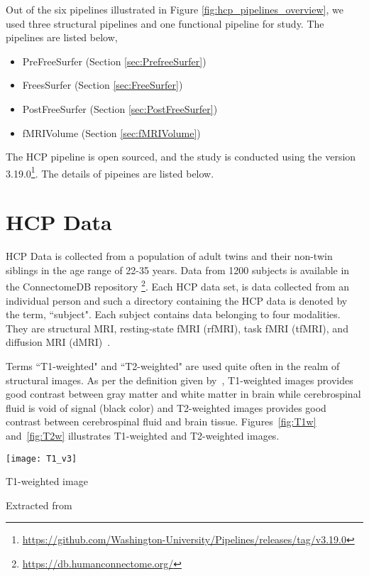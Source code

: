 Out of the six pipelines illustrated in Figure \ref{fig:hcp_pipelines_overview}, we used three structural pipelines and one functional pipeline for study. The pipelines are listed below, 
\begin{itemize}
  \item PreFreeSurfer (Section \ref{sec:PrefreeSurfer})
  \item FreesSurfer   (Section \ref{sec:FreeSurfer})
  \item PostFreeSurfer (Section \ref{sec:PostFreeSurfer})
  \item fMRIVolume    (Section \ref{sec:fMRIVolume})
\end{itemize}

The HCP pipeline is open sourced, and the study is conducted using the version 3.19.0\footnote{\url{https://github.com/Washington-University/Pipelines/releases/tag/v3.19.0}}. The details of pipeines are listed below.

\section{HCP Data} \label{HCP_Data}
HCP Data is collected from a population of adult twins and their non-twin siblings in the age range of 22-35 years. Data from 1200 subjects is available in the ConnectomeDB repository \footnote{\url{https://db.humanconnectome.org/}}. Each HCP data set, is data collected from an individual person and such a directory containing the HCP data is denoted by the term, ``subject". Each subject contains data belonging to four modalities. They are structural MRI, resting-state fMRI (rfMRI), task fMRI (tfMRI), and diffusion MRI (dMRI)~\cite{HCPData}.

\indent Terms ``T1-weighted" and ``T2-weighted" are used quite often in the realm of structural images. As per the definition given by~\cite{t1w_t2w}, T1-weighted images provides good contrast between gray matter and white matter in brain while cerebrospinal fluid is void of signal (black color) and T2-weighted images provides good contrast between cerebrospinal fluid and brain tissue. Figures~\ref{fig:T1w} and~\ref{fig:T2w} illustrates T1-weighted and T2-weighted images.\\

\begin{center}
  \texttt{[image: T1\_v3]}
  \caption{T1-weighted image}
  \label{fig:T1w}
  \caption*{Extracted from \cite{t1w_t2w}}
\end{center}

